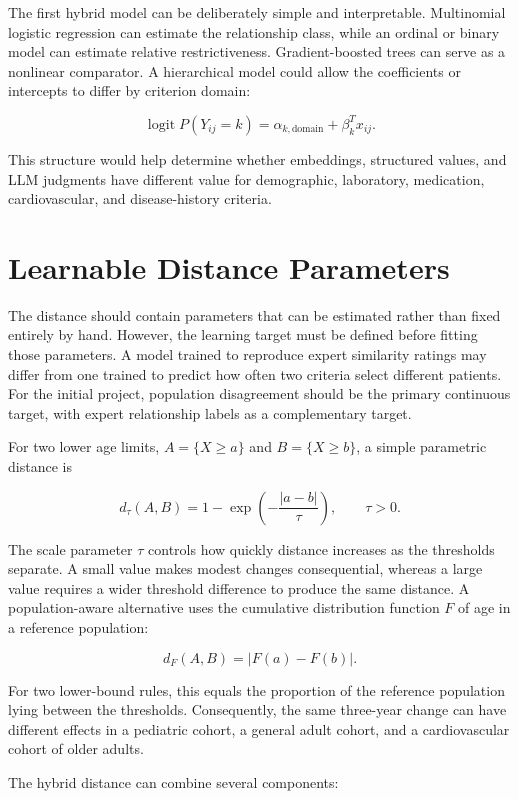 \documentclass[11pt]{article}
\begin{document}
The first hybrid model can be deliberately simple and interpretable. Multinomial logistic regression can estimate the relationship class, while an ordinal or binary model can estimate relative restrictiveness. Gradient-boosted trees can serve as a nonlinear comparator. A hierarchical model could allow the coefficients or intercepts to differ by criterion domain:

\[
\operatorname{logit}P(Y_{ij}=k)
=\alpha_{k,\mathrm{domain}}+\beta_k^T x_{ij}.
\]

This structure would help determine whether embeddings, structured values, and LLM judgments have different value for demographic, laboratory, medication, cardiovascular, and disease-history criteria.

\section{Learnable Distance Parameters}

The distance should contain parameters that can be estimated rather than fixed entirely by hand. However, the learning target must be defined before fitting those parameters. A model trained to reproduce expert similarity ratings may differ from one trained to predict how often two criteria select different patients. For the initial project, population disagreement should be the primary continuous target, with expert relationship labels as a complementary target.

For two lower age limits, $A=\{X\geq a\}$ and $B=\{X\geq b\}$, a simple parametric distance is

\[
d_{\tau}(A,B)=1-\exp\left(-\frac{|a-b|}{\tau}\right), \qquad \tau>0.
\]

The scale parameter $\tau$ controls how quickly distance increases as the thresholds separate. A small value makes modest changes consequential, whereas a large value requires a wider threshold difference to produce the same distance. A population-aware alternative uses the cumulative distribution function $F$ of age in a reference population:

\[
d_F(A,B)=|F(a)-F(b)|.
\]

For two lower-bound rules, this equals the proportion of the reference population lying between the thresholds. Consequently, the same three-year change can have different effects in a pediatric cohort, a general adult cohort, and a cardiovascular cohort of older adults.

The hybrid distance can combine several components:
\end{document}
